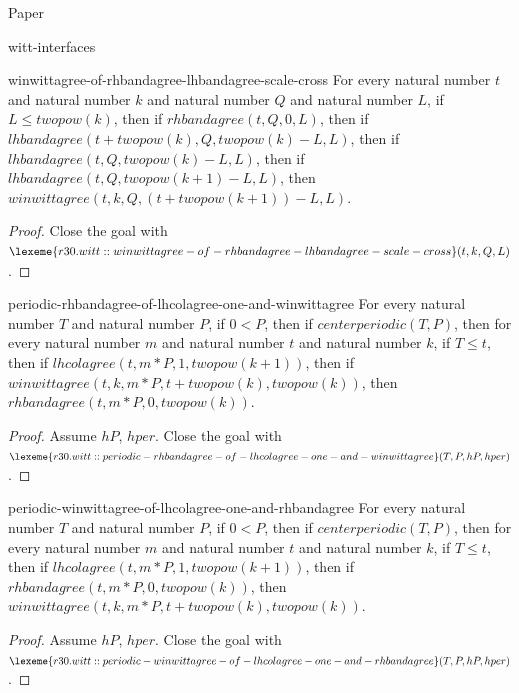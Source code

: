 \begin{lexlean}{Paper}
\begin{section}{witt-interfaces}
  \begin{theorem}{winwittagree-of-rhbandagree-lhbandagree-scale-cross}
  For every natural number \(t\) and natural number \(k\) and natural number \(Q\) and natural number \(L\), if \(L ≤ twopow(k)\), then if \(rhbandagree(t, Q, 0, L)\), then if \(lhbandagree(t + twopow(k), Q, twopow(k) - L, L)\), then if \(lhbandagree(t, Q, twopow(k) - L, L)\), then if \(lhbandagree(t, Q, twopow(k + 1) - L, L)\), then \(winwittagree(t, k, Q, (t + twopow(k + 1)) - L, L)\).
  \begin{proof}
  Close the goal with \(\lexeme{r30.witt::winwittagree-of-rhbandagree-lhbandagree-scale-cross}(t, k, Q, L)\).
  \end{proof}
  \end{theorem}

  \begin{theorem}{periodic-rhbandagree-of-lhcolagree-one-and-winwittagree}
  For every natural number \(T\) and natural number \(P\), if \(0 < P\), then if \(centerperiodic(T, P)\), then for every natural number \(m\) and natural number \(t\) and natural number \(k\), if \(T ≤ t\), then if \(lhcolagree(t, m * P, 1, twopow(k + 1))\), then if \(winwittagree(t, k, m * P, t + twopow(k), twopow(k))\), then \(rhbandagree(t, m * P, 0, twopow(k))\).
  \begin{proof}
  Assume \(hP\), \(hper\).
  Close the goal with \(\lexeme{r30.witt::periodic-rhbandagree-of-lhcolagree-one-and-winwittagree}(T, P, hP, hper)\).
  \end{proof}
  \end{theorem}

  \begin{theorem}{periodic-winwittagree-of-lhcolagree-one-and-rhbandagree}
  For every natural number \(T\) and natural number \(P\), if \(0 < P\), then if \(centerperiodic(T, P)\), then for every natural number \(m\) and natural number \(t\) and natural number \(k\), if \(T ≤ t\), then if \(lhcolagree(t, m * P, 1, twopow(k + 1))\), then if \(rhbandagree(t, m * P, 0, twopow(k))\), then \(winwittagree(t, k, m * P, t + twopow(k), twopow(k))\).
  \begin{proof}
  Assume \(hP\), \(hper\).
  Close the goal with \(\lexeme{r30.witt::periodic-winwittagree-of-lhcolagree-one-and-rhbandagree}(T, P, hP, hper)\).
  \end{proof}
  \end{theorem}


\end{section}
\end{lexlean}
